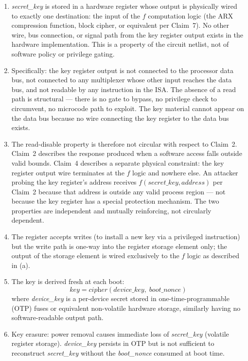 \documentclass[12pt,letterpaper]{article}
\begin{document}
\begin{enumerate}[label=(\alph*),noitemsep]
  \item \textit{secret\_key} is stored in a hardware register whose
        output is physically wired to exactly one destination: the
        input of the $f$ computation logic (the ARX compression
        function, block cipher, or equivalent per Claim~7).
        No other wire, bus connection, or signal path from the
        key register output exists in the hardware implementation.
        This is a property of the circuit netlist, not of software
        policy or privilege gating.

  \item Specifically: the key register output is not connected to the
        processor data bus, not connected to any multiplexer whose
        other input reaches the data bus, and not readable by any
        instruction in the ISA. The absence of a read path is
        structural --- there is no gate to bypass, no privilege check
        to circumvent, no microcode path to exploit. The key material
        cannot appear on the data bus because no wire connecting the
        key register to the data bus exists.

  \item The read-disable property is therefore not circular with
        respect to Claim~2. Claim~2 describes the response produced
        when a software access falls outside valid bounds. Claim~4
        describes a separate physical constraint: the key register
        output wire terminates at the $f$ logic and nowhere else.
        An attacker probing the key register's address receives
        $f(\textit{secret\_key}, \textit{address})$ per Claim~2
        because that address is outside any valid process region ---
        not because the key register has a special protection
        mechanism. The two properties are independent and
        mutually reinforcing, not circularly dependent.

  \item The register accepts writes (to install a new key via a
        privileged instruction) but the write path is one-way into
        the register storage element only; the output of the storage
        element is wired exclusively to the $f$ logic as described
        in (a).

  \item The key is derived fresh at each boot:
        \[
          \textit{key} = \textit{cipher}(\textit{device\_key},\; \textit{boot\_nonce})
        \]
        where \textit{device\_key} is a per-device secret stored in
        one-time-programmable (OTP) fuses or equivalent non-volatile
        hardware storage, similarly having no software-readable output path.

  \item Key erasure: power removal causes immediate loss of
        \textit{secret\_key} (volatile register storage).
        \textit{device\_key} persists in OTP but is not sufficient
        to reconstruct \textit{secret\_key} without the
        \textit{boot\_nonce} consumed at boot time.
\end{enumerate}
\end{document}
